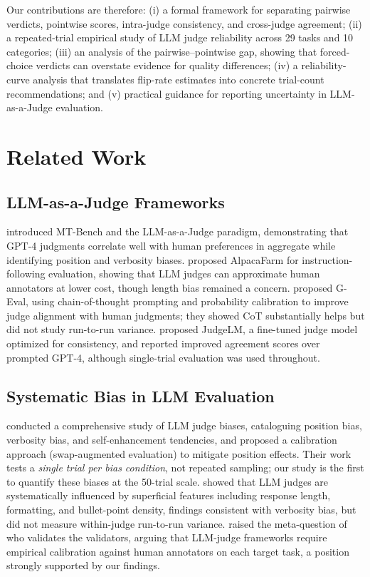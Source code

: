 \documentclass{ijclclp}
\begin{document}
Our contributions are therefore: (i) a formal framework for separating pairwise verdicts, pointwise scores, intra-judge consistency, and cross-judge agreement; (ii) a repeated-trial empirical study of LLM judge reliability across 29 tasks and 10 categories; (iii) an analysis of the pairwise--pointwise gap, showing that forced-choice verdicts can overstate evidence for quality differences; (iv) a reliability-curve analysis that translates flip-rate estimates into concrete trial-count recommendations; and (v) practical guidance for reporting uncertainty in LLM-as-a-Judge evaluation.

\section{Related Work}

\subsection{LLM-as-a-Judge Frameworks}

\citet{zheng2023judging} introduced MT-Bench and the LLM-as-a-Judge paradigm, demonstrating that GPT-4 judgments correlate well with human preferences in aggregate while identifying position and verbosity biases. \citet{dubois2024alpacafarm} proposed AlpacaFarm for instruction-following evaluation, showing that LLM judges can approximate human annotators at lower cost, though length bias remained a concern. \citet{liu2023geval} proposed G-Eval, using chain-of-thought prompting and probability calibration to improve judge alignment with human judgments; they showed CoT substantially helps but did not study run-to-run variance. \citet{zhu2023judgelm} proposed JudgeLM, a fine-tuned judge model optimized for consistency, and reported improved agreement scores over prompted GPT-4, although single-trial evaluation was used throughout.

\subsection{Systematic Bias in LLM Evaluation}

\citet{wang2023large} conducted a comprehensive study of LLM judge biases, cataloguing position bias, verbosity bias, and self-enhancement tendencies, and proposed a calibration approach (swap-augmented evaluation) to mitigate position effects. Their work tests a \textit{single trial per bias condition}, not repeated sampling; our study is the first to quantify these biases at the 50-trial scale. \citet{stureborg2024large} showed that LLM judges are systematically influenced by superficial features including response length, formatting, and bullet-point density, findings consistent with verbosity bias, but did not measure within-judge run-to-run variance. \citet{shankar2024validates} raised the meta-question of who validates the validators, arguing that LLM-judge frameworks require empirical calibration against human annotators on each target task, a position strongly supported by our findings.
\end{document}
